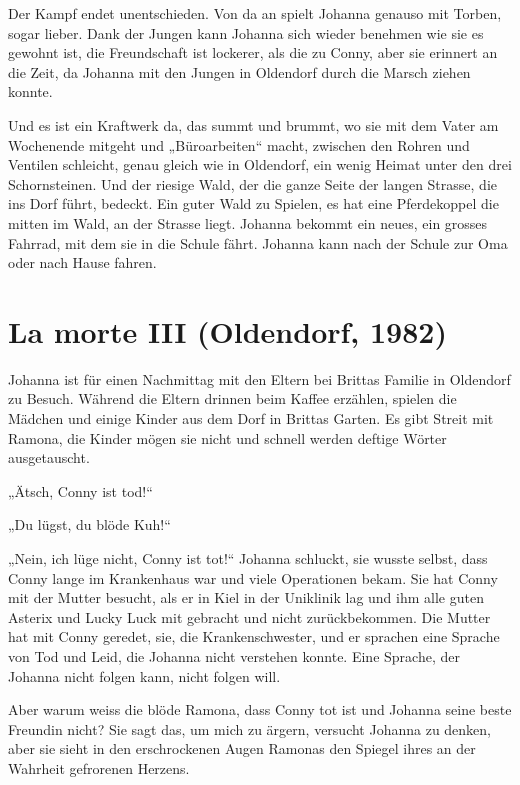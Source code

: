 \documentclass[10pt,titlepage,a5paper]{book}
\begin{document}
Der Kampf endet unentschieden. Von da an spielt Johanna genauso mit Torben, sogar lieber. Dank der Jungen kann Johanna sich wieder benehmen wie sie es gewohnt ist, die Freundschaft ist lockerer, als die zu Conny, aber sie erinnert an die Zeit, da Johanna mit den Jungen in Oldendorf durch die Marsch ziehen konnte.

 Und es ist ein Kraftwerk da, das summt und brummt, wo sie mit dem Vater am Wochenende mitgeht und „Büroarbeiten“ macht, zwischen den Rohren und Ventilen schleicht, genau gleich wie in Oldendorf, ein wenig Heimat unter den drei Schornsteinen.  Und der riesige Wald, der die ganze Seite der langen Strasse, die ins Dorf führt, bedeckt. Ein guter Wald zu Spielen, es hat eine Pferdekoppel die mitten im Wald, an der Strasse liegt.
Johanna bekommt ein neues, ein grosses Fahrrad, mit dem sie in die Schule fährt. Johanna kann nach der Schule zur Oma oder nach Hause fahren. 



\section*{La morte III (Oldendorf, 1982)}




Johanna ist für einen Nachmittag mit den Eltern bei Brittas Familie in Oldendorf zu Besuch. Während die Eltern drinnen beim Kaffee erzählen, spielen die Mädchen und einige Kinder aus dem Dorf in Brittas Garten. Es gibt Streit mit Ramona, die Kinder mögen sie nicht und schnell werden  deftige Wörter ausgetauscht.  

„Ätsch, Conny ist tod!“

„Du lügst, du blöde Kuh!“

„Nein, ich lüge nicht, Conny ist tot!“ Johanna schluckt, sie wusste selbst, dass Conny lange im Krankenhaus war und viele Operationen bekam. Sie hat Conny mit der Mutter besucht, als er in Kiel in der Uniklinik lag und ihm alle guten Asterix und Lucky Luck mit gebracht und  nicht zurückbekommen. Die Mutter hat mit Conny geredet, sie, die Krankenschwester, und er sprachen eine Sprache von Tod und Leid, die Johanna nicht verstehen konnte. Eine Sprache, der Johanna nicht folgen kann, nicht folgen will.

Aber warum weiss die blöde Ramona, dass Conny tot ist und Johanna seine beste Freundin nicht? Sie sagt das, um mich zu ärgern, versucht  Johanna zu denken, aber sie sieht in den erschrockenen Augen Ramonas den Spiegel ihres an der Wahrheit gefrorenen Herzens.
\end{document}
